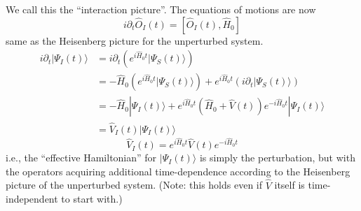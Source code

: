 We call this the ``interaction picture''. The equations of motions are now
\[ i\partial _t\hat{O}_I\left( t \right) =\left[ \hat{O}_I\left( t \right) ,\hat{H}_0 \right] \]
same as the Heisenberg picture for the unperturbed system.
\begin{align*}
    i\partial _t|\Psi_I \left( t \right) \rangle&=i\partial _t\left( e^{i\hat{H}_0t}|\Psi_S \left( t \right) \rangle \right) \\
    &=-\hat{H}_0\left( e^{i\hat{H}_0t}|\Psi_S \left( t \right) \rangle  \right) +e^{i\hat{H}_0t}\left( i\partial _t|\Psi_S \left( t \right) \rangle \right) \\
    &=-\hat{H}_0|\Psi_I \left( t \right) \rangle+e^{i\hat{H}_0t}\left( \hat{H}_0+\hat{V}\left( t \right) \right) e^{-i\hat{H}_0t}|\Psi_I \left( t \right) \rangle\\
    &=\hat{V}_I\left( t \right) |\Psi_I \left( t \right) \rangle
\end{align*}
\[ \hat{V}_I\left( t \right) =e^{i\hat{H}_0t}\hat{V}\left( t \right) e^{-i\hat{H}_0t}\]
i.e., the ``effective Hamiltonian'' for $|\Psi_I(t)\rangle$ is simply the perturbation, but with the operators acquiring additional time-dependence according to the Heisenberg picture of the unperturbed system. (Note: this holds even if $\hat{V}$ itself is time-independent to start with.)

